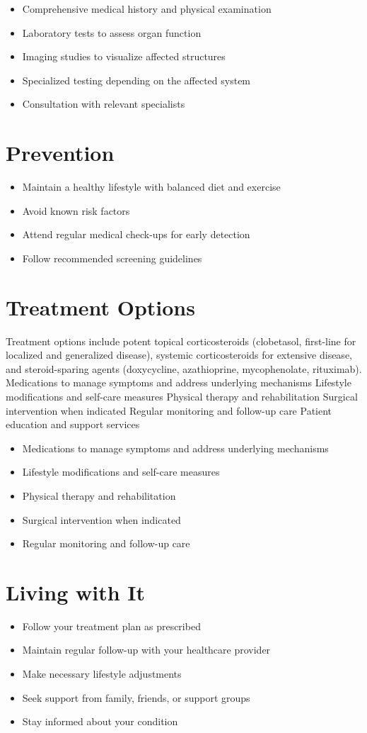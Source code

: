 \begin{itemize}[noitemsep]
  \item Comprehensive medical history and physical examination
  \item Laboratory tests to assess organ function
  \item Imaging studies to visualize affected structures
  \item Specialized testing depending on the affected system
  \item Consultation with relevant specialists
\end{itemize}
\section{Prevention}
\begin{itemize}[noitemsep]
  \item Maintain a healthy lifestyle with balanced diet and exercise
  \item Avoid known risk factors
  \item Attend regular medical check-ups for early detection
  \item Follow recommended screening guidelines
\end{itemize}
\section{Treatment Options}
Treatment options include potent topical corticosteroids (clobetasol, first-line for localized and generalized disease), systemic corticosteroids for extensive disease, and steroid-sparing agents (doxycycline, azathioprine, mycophenolate, rituximab). Medications to manage symptoms and address underlying mechanisms Lifestyle modifications and self-care measures Physical therapy and rehabilitation Surgical intervention when indicated Regular monitoring and follow-up care Patient education and support services

\begin{itemize}[noitemsep]
  \item Medications to manage symptoms and address underlying mechanisms
  \item Lifestyle modifications and self-care measures
  \item Physical therapy and rehabilitation
  \item Surgical intervention when indicated
  \item Regular monitoring and follow-up care
\end{itemize}
\section{Living with It}
\begin{itemize}[noitemsep]
  \item Follow your treatment plan as prescribed
  \item Maintain regular follow-up with your healthcare provider
  \item Make necessary lifestyle adjustments
  \item Seek support from family, friends, or support groups
  \item Stay informed about your condition
\end{itemize}
